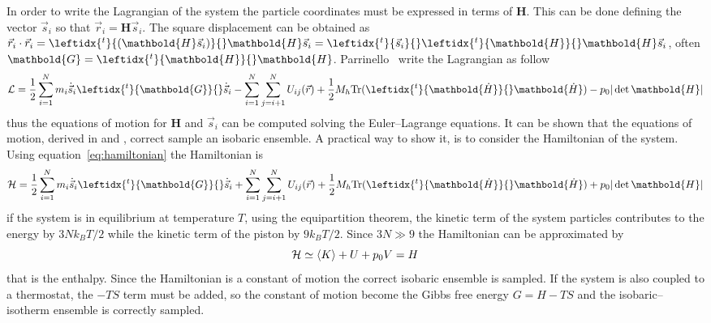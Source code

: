 In order to write the Lagrangian of the system the particle coordinates must be expressed in terms of
$\mathbold{H}$. This can be done defining the vector $\vec s_i$ so that $\vec r_i =  \mathbold{H} \vec s_i$. The
square displacement can be obtained as $\vec r_i \cdot \vec r_i = \leftidx{^t}{ (\mathbold{H} \vec s_i)}{}  \mathbold{H} \vec s_i = \leftidx{^t}{\vec s_i}{} \leftidx{^t}{ \mathbold{H}}{}  \mathbold{H} \vec s_i$, often
$\mathbold{G} = \leftidx{^t}{ \mathbold{H}}{} \mathbold{H}$. Parrinello \etal\, write the Lagrangian as follow
\begin{equation*}
	\mathcal{L} = \frac{1}{2}\sum_{i=1}^N m_i \dot{\vec s}_i \leftidx{^t}{\mathbold{G}}{} \dot{\vec s}_i - \sum_{i=1}^N \sum_{j=i+1}^N U_{ij}(\vec r) +  \frac{1}{2} M_h \text{Tr}(\leftidx{^t}{\mathbold{\dot H}}{} \mathbold{\dot H} ) -  p_0 |\det \mathbold{H}|
\end{equation*}
thus the equations of motion for $ \mathbold{H}$ and $\vec s_i$ can be computed solving the Euler--Lagrange
equations. It can be shown that the equations of motion, derived in \cite{ParrinelloBarostat1} and
\cite{ParrinelloBarostat2}, correct sample an isobaric ensemble. A practical way to show it, is to consider the
Hamiltonian of the system. Using equation~\eqref{eq:hamiltonian} the Hamiltonian is
\begin{equation*}
	\mathcal{H} = \frac{1}{2}\sum_{i=1}^N m_i \dot{\vec s}_i \leftidx{^t}{\mathbold{G}}{} \dot{\vec s}_i + \sum_{i=1}^N \sum_{j=i+1}^N U_{ij}(\vec r) +  \frac{1}{2} M_h \text{Tr}( \leftidx{^t}{\mathbold{\dot H}}{} \mathbold{\dot H} ) + p_0 |\det\mathbold{H}|
\end{equation*}
if the system is in equilibrium at temperature $T$, using the equipartition theorem, the kinetic term of the
system particles contributes to the energy by $3Nk_BT/2$ while the kinetic term of the piston by $9k_BT/2$. Since
$3N \gg 9$ the Hamiltonian can be approximated by
\begin{equation*}
	\mathcal{H} \simeq \left \langle K \right \rangle + U + p_0 V = H
\end{equation*}
that is the enthalpy. Since the Hamiltonian is a constant of motion the correct isobaric ensemble is sampled. If
the system is also coupled to a thermostat, the $-TS$ term must be added, so the constant of motion become the
Gibbs free energy $G = H - TS$ and the isobaric--isotherm ensemble is correctly sampled.

